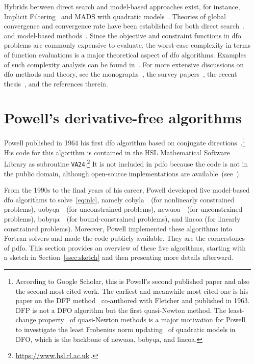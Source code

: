 \documentclass[
    smallextended,  %
    draft,          %
    final,          %
]{svjour3}
\begin{document}
Hybrids between direct search and model-based approaches exist, for
instance, Implicit Filtering~\cite[Algorithm~4.7]{Kelley_2011} and MADS with quadratic models~\cite{Conn_LeDigabel_2013}.
Theories of global convergence and convergence rate have been established for both
direct search~\cite{Torczon_1997,Kolda_Lewis_Torczon_2003,Vicente_2013,Gratton_Etal_2015,Dodangeh_Vicente_2016}.
and model-based methods~\cite{Conn_Scheinberg_Toint_1997a,Conn_Scheinberg_Vicente_2009a,Powell_2012,Garmanjani_Judice_Vicente_2016}.
Since the objective and constraint functions in \gls{dfo} problems are commonly expensive to
evaluate, the worst-case complexity in terms of function evaluations is a major theoretical aspect of \gls{dfo} algorithms.
Examples of such complexity analysis can be found in~\cite{Vicente_2013,Gratton_Etal_2015,Dodangeh_Vicente_2016,Garmanjani_Judice_Vicente_2016}.
For more extensive discussions on \gls{dfo} methods and theory, see the monographs~\cite{Conn_Scheinberg_Vicente_2009b,Audet_Hare_2017}, the survey
papers~\cite{Rios_Sahinidis_2013,Custodio_Scheinberg_Vicente_2017,Larson_Menickelly_Wild_2019}, the recent thesis~\cite{Ragonneau_2022}, and the references therein.

\section{Powell's derivative-free algorithms}
\label{sec:powell}

Powell published in 1964 his first \gls{dfo} algorithm based on conjugate
directions~\cite{Powell_1964}.\footnote{According to Google Scholar, this is Powell's second published paper and also the second most cited work.
The earliest and meanwhile most cited one is his paper on the DFP method~\cite{Fletcher_Powell_1963}
co-authored with Fletcher and published in 1963.
DFP is not a DFO algorithm but the first
quasi-Newton method.
The least-change property~\cite{Dennis_Schnabel_1979} of quasi-Newton methods
is a major motivation for Powell to investigate the least Frobenius norm updating~\cite{Powell_2004b}
of quadratic models in DFO, which is the backbone of \gls{newuoa}, \gls{bobyqa}, and \gls{lincoa}.}
His code for this algorithm is contained in the
HSL Mathematical Software Library as subroutine \texttt{VA24}.\footnote{\url{https://www.hsl.rl.ac.uk}\,.}
It is not included in \gls{pdfo} because the code is not in the public domain, although open-source implementations are available~(see~\cite[footnote~4]{Conn_Scheinberg_Toint_1997b}).

From the 1990s to the final years of his career, Powell developed five model-based \gls{dfo}
algorithms to solve~\eqref{eq:nlc}, namely \gls{cobyla}~\cite{Powell_1994}~(for nonlinearly
constrained problems), \gls{uobyqa}~\cite{Powell_2002}~(for unconstrained problems),
\gls{newuoa}~\cite{Powell_2006}~(for unconstrained problems), \gls{bobyqa}~\cite{Powell_2009}~(for
bound-constrained problems), and \gls{lincoa} (for linearly constrained problems).
Moreover, Powell implemented these algorithms into Fortran solvers and made the code publicly available.
They are the cornerstones of \gls{pdfo}.
This section provides an overview of these five algorithms, starting with a sketch in
Section~\ref{ssec:sketch} and then presenting more details afterward.
\end{document}
